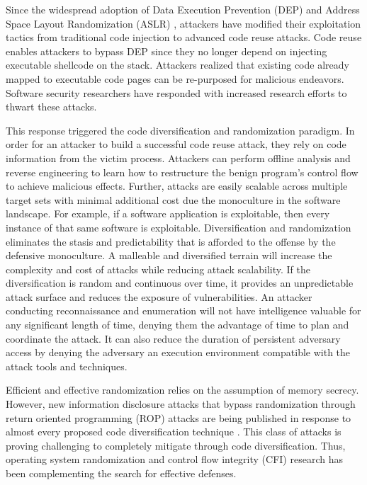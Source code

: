 \documentclass[preprint,12pt]{elsarticle}
\begin{document}
Since the widespread adoption of Data Execution Prevention (DEP) and Address Space Layout Randomization (ASLR) \cite{team2003pax}, attackers have modified their exploitation tactics from traditional code injection to advanced code reuse attacks. Code reuse enables attackers to bypass DEP since they no longer depend on injecting executable shellcode on the stack. Attackers realized that existing code already mapped to executable code pages can be re-purposed for malicious endeavors. Software security researchers have responded with increased research efforts to thwart these attacks.

This response triggered the code diversification and randomization paradigm. In order for an attacker to build a successful code reuse attack, they rely on code information from the victim process. Attackers can perform offline analysis and reverse engineering to learn how to restructure the benign program's control flow to achieve malicious effects. Further, attacks are easily scalable across multiple target sets with minimal additional cost due the monoculture in the software landscape. For example, if a software application is exploitable, then every instance of that same software is exploitable. Diversification and randomization eliminates the stasis and predictability that is afforded to the offense by the defensive monoculture. A malleable and diversified terrain will increase the complexity and cost of attacks while reducing attack scalability. If the diversification is random and continuous over time, it provides an unpredictable attack surface and reduces the exposure of vulnerabilities. An attacker conducting reconnaissance and enumeration will not have intelligence valuable for any significant length of time, denying them the advantage of time to plan and coordinate the attack. It can also reduce the duration of persistent adversary access by denying the adversary an execution environment compatible with the attack tools and techniques.

Efficient and effective randomization relies on the assumption of memory secrecy. However, new information disclosure attacks that bypass randomization through return oriented programming (ROP) attacks are being published in response to almost every proposed code diversification technique \cite{strackx2009breaking}\cite{snow2013just}\cite{schuster2015counterfeit}\cite{bletsch2011jump}\cite{rudd2017address}\cite{shacham2007geometry}\cite{bittau2014hacking}. This class of attacks is proving challenging to completely mitigate through code diversification. Thus, operating system randomization and control flow integrity (CFI) research has been complementing the search for effective defenses.
\end{document}
